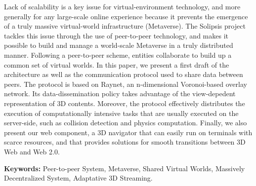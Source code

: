 Lack of scalability is a key issue for virtual-environment technology,
and more generally for any large-scale online experience because it
prevents the emergence of a truly massive virtual-world infrastructure
(Metaverse). The Solipsis project tackles this issue through the use
of peer-to-peer technology, and makes it possible to build and manage
a world-scale Metaverse in a truly distributed manner. Following a
peer-to-peer scheme, entities collaborate to build up a common set of
virtual worlds. In this paper, we present a first draft of the \sol
architecture as well as the communication protocol used to share data
between peers. The protocol is based on Raynet, an n-dimensional
Voronoi-based overlay network. Its data-dissemination policy takes
advantage of the view-depedent representation of 3D
contents. Moreover, the protocol effectively distributes the execution
of computationally intensive tasks that are usually executed on the
server-side, such as collision detection and physics
computation. Finally, we also present our web component, a 3D
navigator that can easily run on terminals with scarce resources, and
that provides solutions for smooth transitions between 3D Web and Web
2.0.  

\textbf{Keywords:} Peer-to-peer System, Metaverse, Shared Virtual
Worlds, Massively Decentralized System, Adaptative 3D Streaming.
